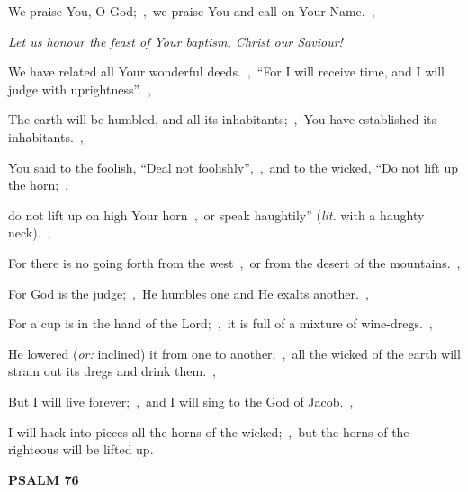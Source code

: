 \documentclass[12pt,twoside,a5paper]{article}
\newcommand{\psalm}[1]{\textbf{PSALM {#1}}\nopagebreak}
\newcommand{\qanona}[1]{{\liturgicalhint{Qanona.} \emph{#1}}}
\newcommand{\translationoption}[1]{\emph{or:} #1}
\newcommand{\translationliteral}[1]{\emph{lit.} #1}
\begin{document}
\begin{normalparskip}
  We praise You, O God;~\sep\ we praise You and call on Your Name.~\sep

  \qanona{Let us honour the feast of Your baptism, Christ our Saviour!}

  We have related all Your wonderful deeds.~\sep\ ``For I will receive time, and I will judge with uprightness''.~\sep

  The earth will be humbled, and all its inhabitants;~\sep\ You have established its inhabitants.~\sep

  You said to the foolish, ``Deal not foolishly'',~\sep\ and to the wicked, ``Do not lift up the horn;~\sep

  do not lift up on high Your horn~\sep\ or speak haughtily'' (\translationliteral{with a haughty neck}).~\sep

  For there is no going forth from the west~\sep\ or from the desert of the mountains.~\sep

  For God is the judge;~\sep\ He humbles one and He exalts another.~\sep

  For a cup is in the hand of the Lord;~\sep\ it is full of a mixture of wine-dregs.~\sep

  He lowered (\translationoption{inclined}) it from one to another;~\sep\ all the wicked of the earth will strain out its dregs and drink them.~\sep

  But I will live forever;~\sep\ and I will sing to the God of Jacob.~\sep

  I will hack into pieces all the horns of the wicked;~\sep\ but the horns of the righteous will be lifted up.
\end{normalparskip}

\psalm{76}
\end{document}
